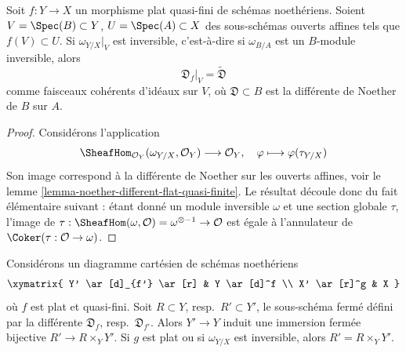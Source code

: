\begin{lemma}
\label{lemma-flat-gorenstein-agree-noether}
Soit $f : Y \to X$ un morphisme plat quasi-fini de schémas noethériens.
Soient $V = \Spec(B) \subset Y$, $U = \Spec(A) \subset X$
des sous-schémas ouverts affines tels que $f(V) \subset U$.
Si $\omega_{Y/X}|_V$ est inversible, c'est-à-dire si $\omega_{B/A}$
est un $B$-module inversible, alors
$$
\mathfrak{D}_f|_V = \widetilde{\mathfrak{D}}
$$
comme faisceaux cohérents d'idéaux sur $V$, où
$\mathfrak{D} \subset B$ est la différente de Noether de $B$ sur $A$.
\end{lemma}

\begin{proof}
Considérons l'application
$$
\SheafHom_{\mathcal{O}_Y}(\omega_{Y/X}, \mathcal{O}_Y)
\longrightarrow
\mathcal{O}_Y,\quad
\varphi \longmapsto \varphi(\tau_{Y/X})
$$
Son image correspond à la différente de Noether
sur les ouverts affines, voir le lemme \ref{lemma-noether-different-flat-quasi-finite}.
Le résultat découle donc du fait élémentaire suivant : étant donné
un module inversible $\omega$ et une section globale $\tau$,
l'image de
$\tau : \SheafHom(\omega, \mathcal{O}) = \omega^{\otimes -1} \to \mathcal{O}$
est égale à l'annulateur de $\Coker(\tau : \mathcal{O} \to \omega)$.
\end{proof}

\begin{lemma}
\label{lemma-base-change-different}
Considérons un diagramme cartésien de schémas noethériens
$$
\xymatrix{
Y' \ar[d]_{f'} \ar[r] & Y \ar[d]^f \\
X' \ar[r]^g & X
}
$$
où $f$ est plat et quasi-fini. Soit $R \subset Y$, resp.\ $R' \subset Y'$,
le sous-schéma fermé défini par la différente
$\mathfrak{D}_f$, resp.\ $\mathfrak{D}_{f'}$.
Alors $Y' \to Y$ induit une immersion fermée bijective $R' \to R \times_Y Y'$.
Si $g$ est plat ou si $\omega_{Y/X}$ est inversible, alors
$R' = R \times_Y Y'$.
\end{lemma}

